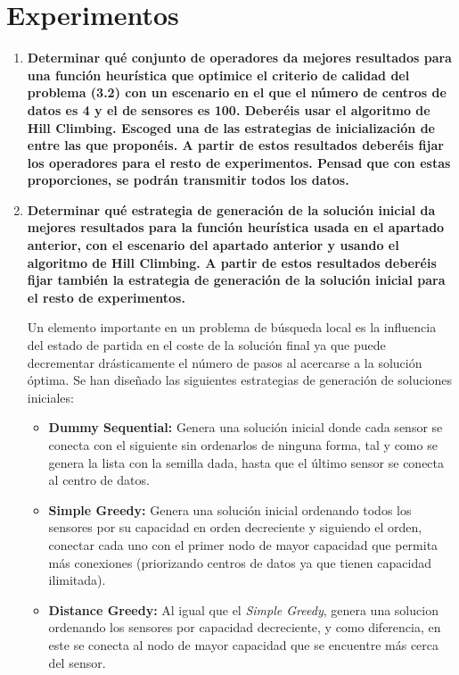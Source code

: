 \documentclass{article}
\begin{document}
\section{Experimentos}
\begin{enumerate}
  \item \textbf{Determinar qué conjunto de operadores da mejores resultados para una función heurística que optimice el criterio de calidad del problema (3.2) con un escenario en el que el número de centros de datos es 4 y el de sensores es 100. Deberéis usar el algoritmo de Hill Climbing. Escoged una de las estrategias de inicialización de entre las que proponéis. A partir de estos resultados deberéis fijar los operadores para el resto de experimentos. Pensad que con estas proporciones, se podrán transmitir todos los datos.}

  \item \textbf{Determinar qué estrategia de generación de la solución inicial da mejores resultados para la función heurística usada en el apartado anterior, con el escenario del apartado anterior y usando el algoritmo de Hill Climbing. A partir de estos resultados deberéis fijar también la estrategia de generación de la solución inicial para el resto de experimentos.}

  Un elemento importante en un problema de búsqueda local es la influencia del estado de partida en el coste de la solución final ya que puede decrementar drásticamente el número de pasos al acercarse a la solución óptima. Se han diseñado las siguientes estrategias de generación de soluciones iniciales:
  \begin{itemize}
    \item \textbf{Dummy Sequential:} Genera una solución inicial donde cada sensor se conecta con el siguiente sin ordenarlos de ninguna forma, tal y como se genera la lista con la semilla dada, hasta que el último sensor se conecta al centro de datos.
    \item \textbf{Simple Greedy:} Genera una solución inicial ordenando todos los sensores por su capacidad en orden decreciente y siguiendo el orden, conectar cada uno con el primer nodo de mayor capacidad que permita más conexiones (priorizando centros de datos ya que tienen capacidad ilimitada).
    \item \textbf{Distance Greedy:} Al igual que el \textit{Simple Greedy}, genera una solucion ordenando los sensores por capacidad decreciente, y como diferencia, en este se conecta al nodo de mayor capacidad que se encuentre más cerca del sensor.
  \end{itemize}


\end{enumerate}
\end{document}
